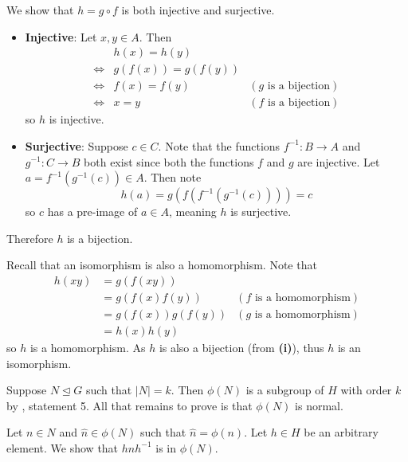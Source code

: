 \begin{questions}
    \item \begin{partquestions}{\roman*}
        \item We show that $h = g\circ f$ is both injective and surjective.
        \begin{itemize}
            \item \textbf{Injective}: Let $x, y \in A$. Then
            \begin{align*}
                &h(x) = h(y)\\
                \iff&g(f(x)) = g(f(y))\\
                \iff&f(x) = f(y) & (g \text{ is a bijection})\\
                \iff&x = y & (f \text{ is a bijection})
            \end{align*}
            so $h$ is injective.
            \item \textbf{Surjective}: Suppose $c \in C$. Note that the functions $f^{-1}: B \to A$ and $g^{-1}: C \to B$ both exist since both the functions $f$ and $g$ are injective. Let $a = f^{-1}(g^{-1}(c)) \in A$. Then note
            \[
                h(a) = g(f(f^{-1}(g^{-1}(c)))) = c
            \]
            so $c$ has a pre-image of $a \in A$, meaning $h$ is surjective.
        \end{itemize}
        Therefore $h$ is a bijection.

        \item Recall that an isomorphism is also a homomorphism.  Note that
        \begin{align*}
            h(xy) &= g(f(xy))\\
            &= g(f(x)f(y)) & (f \text{ is a homomorphism})\\
            &= g(f(x))g(f(y)) & (g \text{ is a homomorphism})\\
            &= h(x)h(y)
        \end{align*}
        so $h$ is a homomorphism. As $h$ is also a bijection (from \textbf{(i)}), thus $h$ is an isomorphism.
    \end{partquestions}

    \item Suppose $N \unlhd G$ such that $|N| = k$. Then $\phi(N)$ is a subgroup of $H$ with order $k$ by , statement 5. All that remains to prove is that $\phi(N)$ is normal.

    Let $n \in N$ and $\hat{n} \in \phi(N)$ such that $\hat{n} = \phi(n)$. Let $h \in H$ be an arbitrary element. We show that $h\hat{n}h^{-1}$ is in $\phi(N)$.


\end{questions}
